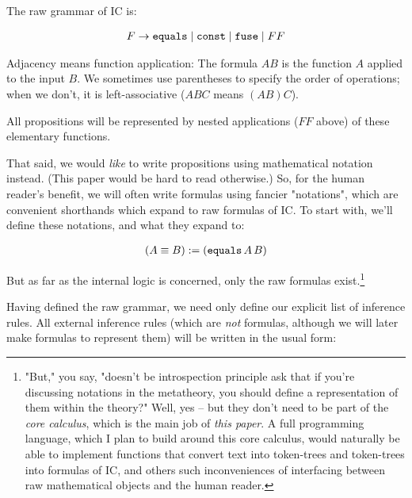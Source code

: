 \documentclass{article}
\begin{document}
  The raw grammar of IC is:
  
  \begin{align*}
    F &\to \operatorname{\texttt{equals}} \mid \operatorname{\texttt{const}} \mid \operatorname{\texttt{fuse}} \mid FF \\
  \end{align*}
  
  Adjacency means function application: The formula $AB$ is the function $A$ applied to the input $B$. We sometimes use parentheses to specify the order of operations; when we don't, it is left-associative ($ABC$ means $(AB)C$).
  
  All propositions will be represented by nested applications ($FF$ above) of these elementary functions.
  
  That said, we would \emph{like} to write propositions using mathematical notation instead.
  (This paper would be hard to read otherwise.)
  So, for the human reader's benefit, we will often write formulas using fancier "notations", which are convenient shorthands which expand to raw formulas of IC.
  To start with, we'll define these notations, and what they expand to:
  
  \begin{align*}
    (A \equiv B) &:= (\operatorname{\texttt{equals}} A\, B)\\
  \end{align*}
  
  But as far as the internal logic is concerned, only the raw formulas exist.\footnote{"But," you say, "doesn't be introspection principle ask that if you're discussing notations in the metatheory, you should define a representation of them within the theory?" Well, yes – but they don't need to be part of the \emph{core calculus}, which is the main job of \emph{this paper}. A full programming language, which I plan to build around this core calculus, would naturally be able to implement functions that convert text into token-trees and token-trees into formulas of IC, and others such inconveniences of interfacing between raw mathematical objects and the human reader.}  
  
  Having defined the raw grammar, we need only define our explicit list of inference rules. 
  All external inference rules (which are \emph{not} formulas, although we will later make formulas to represent them) will be written in the usual form:
  
  \newcommand{\presep}{,\,}
  \newcommand{\globalrule}[2]{#1 &\vdash #2}
  
\end{document}
